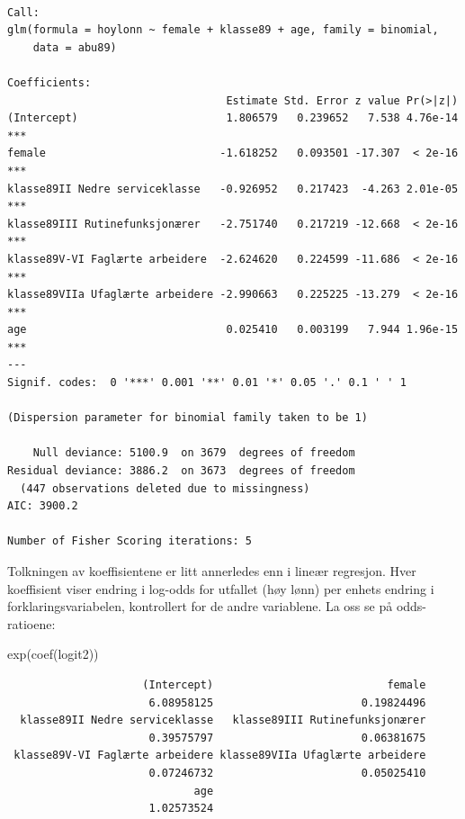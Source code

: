 \documentclass[
  norsk,
  letterpaper,
  DIV=11,
  numbers=noendperiod]{scrreprt}
\newenvironment{Shaded}{\begin{snugshade}}{\end{snugshade}}
\newcommand{\FunctionTok}[1]{\textcolor[rgb]{0.28,0.35,0.67}{#1}}
\newcommand{\NormalTok}[1]{\textcolor[rgb]{0.00,0.23,0.31}{#1}}
\theoremstyle{definition}
\theoremstyle{remark}
\begin{document}
\begin{verbatim}

Call:
glm(formula = hoylonn ~ female + klasse89 + age, family = binomial, 
    data = abu89)

Coefficients:
                                  Estimate Std. Error z value Pr(>|z|)    
(Intercept)                       1.806579   0.239652   7.538 4.76e-14 ***
female                           -1.618252   0.093501 -17.307  < 2e-16 ***
klasse89II Nedre serviceklasse   -0.926952   0.217423  -4.263 2.01e-05 ***
klasse89III Rutinefunksjonærer   -2.751740   0.217219 -12.668  < 2e-16 ***
klasse89V-VI Faglærte arbeidere  -2.624620   0.224599 -11.686  < 2e-16 ***
klasse89VIIa Ufaglærte arbeidere -2.990663   0.225225 -13.279  < 2e-16 ***
age                               0.025410   0.003199   7.944 1.96e-15 ***
---
Signif. codes:  0 '***' 0.001 '**' 0.01 '*' 0.05 '.' 0.1 ' ' 1

(Dispersion parameter for binomial family taken to be 1)

    Null deviance: 5100.9  on 3679  degrees of freedom
Residual deviance: 3886.2  on 3673  degrees of freedom
  (447 observations deleted due to missingness)
AIC: 3900.2

Number of Fisher Scoring iterations: 5
\end{verbatim}

Tolkningen av koeffisientene er litt annerledes enn i lineær regresjon.
Hver koeffisient viser endring i log-odds for utfallet (høy lønn) per
enhets endring i forklaringsvariabelen, kontrollert for de andre
variablene. La oss se på odds-ratioene:

\begin{Shaded}
\begin{Highlighting}[]
\FunctionTok{exp}\NormalTok{(}\FunctionTok{coef}\NormalTok{(logit2))}
\end{Highlighting}
\end{Shaded}

\begin{verbatim}
                     (Intercept)                           female 
                      6.08958125                       0.19824496 
  klasse89II Nedre serviceklasse   klasse89III Rutinefunksjonærer 
                      0.39575797                       0.06381675 
 klasse89V-VI Faglærte arbeidere klasse89VIIa Ufaglærte arbeidere 
                      0.07246732                       0.05025410 
                             age 
                      1.02573524 
\end{verbatim}
\end{document}
